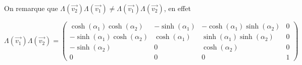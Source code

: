 \documentclass[french]{article}
\begin{document}
	On remarque que $\Lambda(\vec{v_2}) \Lambda(\vec{v_1}) \not= \Lambda(\vec{v_1}) \Lambda(\vec{v_2})$, en effet
	
	$$ \Lambda(\vec{v_1}) \Lambda(\vec{v_2}) = \begin{pmatrix}
	\cosh(\alpha_1)\cosh(\alpha_2) & -\sinh(\alpha_1) & -\cosh(\alpha_1)\sinh(\alpha_2) & 0 \\
	-\sinh(\alpha_1)\cosh(\alpha_2) & \cosh(\alpha_1) & \sinh(\alpha_1)\sinh(\alpha_2) & 0 \\
	-\sinh(\alpha_2) & 0 & \cosh(\alpha_2) & 0 \\
	0 & 0 & 0 & 1
	\end{pmatrix}$$
	
\end{document}
